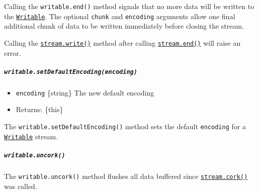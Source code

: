 Calling the \texttt{writable.end()} method signals that no more data
will be written to the
\hyperref[class-streamwritable]{\texttt{Writable}}. The optional
\texttt{chunk} and \texttt{encoding} arguments allow one final
additional chunk of data to be written immediately before closing the
stream.

Calling the
\hyperref[writablewritechunk-encoding-callback]{\texttt{stream.write()}}
method after calling
\hyperref[writableendchunk-encoding-callback]{\texttt{stream.end()}}
will raise an error.

\begin{Shaded}
\begin{Highlighting}[]
\OperatorTok{=} \NormalTok{(}\NormalTok{)}\OperatorTok{;}
\OperatorTok{=}\NormalTok{(}\NormalTok{)}\OperatorTok{;}
\NormalTok{(}\NormalTok{)}\OperatorTok{;}
\NormalTok{(}\NormalTok{)}\OperatorTok{;}
\end{Highlighting}
\end{Shaded}

\subparagraph{\texorpdfstring{\texttt{writable.setDefaultEncoding(encoding)}}{writable.setDefaultEncoding(encoding)}}\label{writable.setdefaultencodingencoding}

\begin{itemize}
\tightlist
\item
  \texttt{encoding} \{string\} The new default encoding
\item
  Returns: \{this\}
\end{itemize}

The \texttt{writable.setDefaultEncoding()} method sets the default
\texttt{encoding} for a
\hyperref[class-streamwritable]{\texttt{Writable}} stream.

\subparagraph{\texorpdfstring{\texttt{writable.uncork()}}{writable.uncork()}}\label{writable.uncork}

The \texttt{writable.uncork()} method flushes all data buffered since
\hyperref[writablecork]{\texttt{stream.cork()}} was called.

